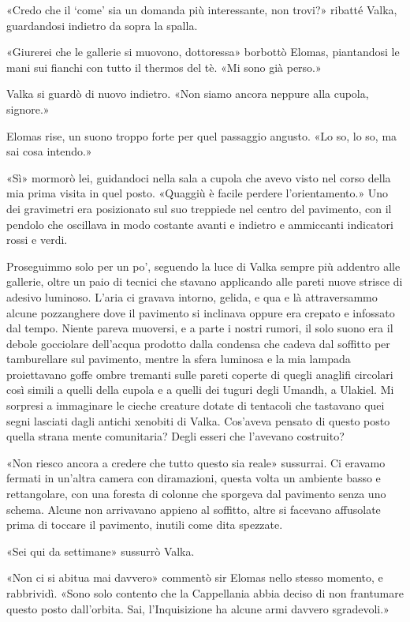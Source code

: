 «Credo che il `come' sia un domanda più interessante, non trovi?»
ribatté Valka, guardandosi indietro da sopra la spalla.

«Giurerei che le gallerie si muovono, dottoressa» borbottò Elomas,
piantandosi le mani sui fianchi con tutto il thermos del tè. «Mi sono
già perso.»

Valka si guardò di nuovo indietro. «Non siamo ancora neppure alla
cupola, signore.»

Elomas rise, un suono troppo forte per quel passaggio angusto. «Lo so,
lo so, ma sai cosa intendo.»

«Sì» mormorò lei, guidandoci nella sala a cupola che avevo visto nel
corso della mia prima visita in quel posto. «Quaggiù è facile perdere
l'orientamento.» Uno dei gravimetri era posizionato sul suo treppiede
nel centro del pavimento, con il pendolo che oscillava in modo costante
avanti e indietro e ammiccanti indicatori rossi e verdi.

Proseguimmo solo per un po', seguendo la luce di Valka sempre più
addentro alle gallerie, oltre un paio di tecnici che stavano applicando
alle pareti nuove strisce di adesivo luminoso. L'aria ci gravava
intorno, gelida, e qua e là attraversammo alcune pozzanghere dove il
pavimento si inclinava oppure era crepato e infossato dal tempo. Niente
pareva muoversi, e a parte i nostri rumori, il solo suono era il debole
gocciolare dell'acqua prodotto dalla condensa che cadeva dal soffitto
per tamburellare sul pavimento, mentre la sfera luminosa e la mia
lampada proiettavano goffe ombre tremanti sulle pareti coperte di quegli
anaglifi circolari così simili a quelli della cupola e a quelli dei
tuguri degli Umandh, a Ulakiel. Mi sorpresi a immaginare le cieche
creature dotate di tentacoli che tastavano quei segni lasciati dagli
antichi xenobiti di Valka. Cos'aveva pensato di questo posto quella
strana mente comunitaria? Degli esseri che l'avevano costruito?

«Non riesco ancora a credere che tutto questo sia reale» sussurrai. Ci
eravamo fermati in un'altra camera con diramazioni, questa volta un
ambiente basso e rettangolare, con una foresta di colonne che sporgeva
dal pavimento senza uno schema. Alcune non arrivavano appieno al
soffitto, altre si facevano affusolate prima di toccare il pavimento,
inutili come dita spezzate.

«Sei qui da settimane» sussurrò Valka.

«Non ci si abitua mai davvero» commentò sir Elomas nello stesso momento,
e rabbrividì. «Sono solo contento che la Cappellania abbia deciso di non
frantumare questo posto dall'orbita. Sai, l'Inquisizione ha alcune armi
davvero sgradevoli.»

